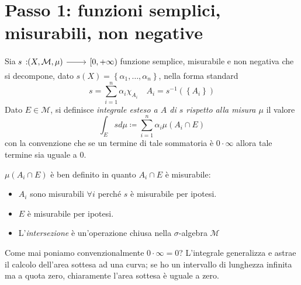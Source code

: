 \section{Passo 1: funzioni semplici, misurabili, non negative}
\begin{define}
	Sia $\funz{s}{\left(X,\mathcal{M},\mu\right)}{\left[0,+\infty\right)}$ funzione semplice, misurabile e non negativa che si decompone, dato $s(X)=\left\{\alpha_1,\ldots, \alpha_n\right\}$, nella forma standard
	\begin{equation*}
		s=\sum_{i=1}^{n}\alpha_i\chi_{A_i}\quad A_i=s^{-1}\left(\left\{A_i\right\}\right)
	\end{equation*}
	Dato $E\in\mathcal{M}$, si definisce \textit{integrale esteso a $A$ di $s$ rispetto alla misura $\mu$} il valore
	\begin{equation}
		\int_{E}sd\mu\coloneqq\sum_{i=1}^{n}\alpha_i\mu\left(A_i\cap E\right)
	\end{equation}
	con la convenzione che se un termine di tale sommatoria è $0\cdot \infty$ allora tale termine sia uguale a $0$.
\end{define}
\begin{observe}
	$\mu\left(A_i\cap E\right)$ è ben definito in quanto $A_i\cap E$ è misurabile:
	\begin{itemize}
		\item $A_i$ sono misurabili $\forall i$ perché $s$ è misurabile per ipotesi.
		\item $E$ è misurabile per ipotesi.
		\item L'\textit{intersezione} è un'operazione chiusa nella $\sigma$-algebra $\mathcal{M}$
	\end{itemize}
\end{observe}
\begin{observe}
	Come mai poniamo convenzionalmente $0\cdot \infty=0$? L'integrale generalizza e astrae il calcolo dell'area sottesa ad una curva; se ho un intervallo di lunghezza infinita ma a quota zero, chiaramente l'area sottesa è uguale a zero.
\end{observe}
